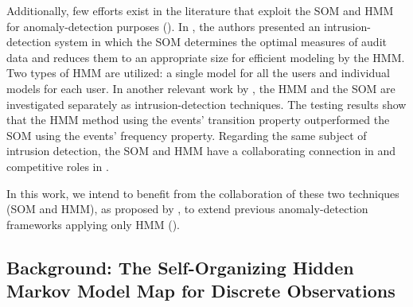 Additionally, few efforts exist in the literature that exploit the SOM and HMM for anomaly-detection purposes (\citet{Cho2002,Wang2006}). In \citet{Cho2002}, the authors presented an intrusion-detection system in which the SOM determines the optimal measures of audit data and reduces them to an appropriate size for efficient modeling by the HMM. Two types of HMM are utilized: a single model for all the users and individual models for each user. In another relevant work by \citet{Wang2006}, the HMM and the SOM are investigated separately as intrusion-detection techniques. The testing results show that the HMM method using the events' transition property outperformed the SOM using the events' frequency property. Regarding the same subject of intrusion detection, the SOM and HMM have a collaborating connection in \citet{Cho2002} and competitive roles in \citet{Wang2006}.

In this work, we intend to benefit from the collaboration of these two techniques (SOM and HMM), as proposed by \citet{Ferles2008}, to extend previous anomaly-detection frameworks applying only HMM (\citet{Anisa2014,Anisa2017,Anisa2019}).

\subsection{Background: The Self-Organizing Hidden Markov Model Map for Discrete Observations}
\label{SOHMMM}

